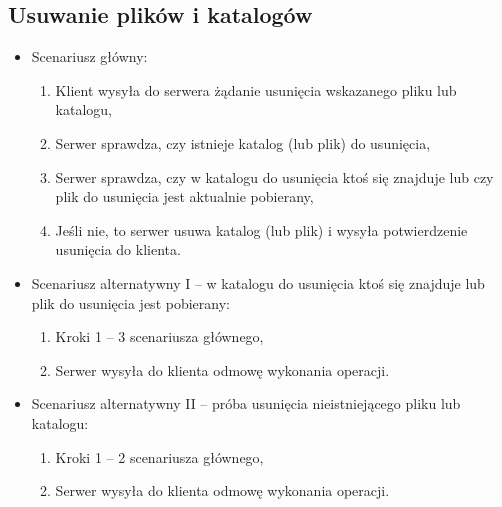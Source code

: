 \documentclass[10pt,a4paper]{article}
\begin{document}
\subsection{Usuwanie plików i katalogów}
\begin{itemize}
    \item Scenariusz główny:
    \begin{enumerate}
        \item Klient wysyła do serwera żądanie usunięcia wskazanego pliku lub katalogu,
        \item Serwer sprawdza, czy istnieje katalog (lub plik) do usunięcia,
        \item Serwer sprawdza, czy w katalogu do usunięcia ktoś się znajduje lub czy plik do usunięcia jest aktualnie pobierany,
        \item Jeśli nie, to serwer usuwa katalog (lub plik) i wysyła potwierdzenie usunięcia do klienta.
    \end{enumerate}

    \item Scenariusz alternatywny I -- w katalogu do usunięcia ktoś się znajduje lub plik do usunięcia jest pobierany:
    \begin{enumerate}
        \item Kroki 1 -- 3 scenariusza głównego,
        \item Serwer wysyła do klienta odmowę wykonania operacji.
    \end{enumerate}

    \item Scenariusz alternatywny II -- próba usunięcia nieistniejącego pliku lub katalogu:
    \begin{enumerate}
        \item Kroki 1 -- 2 scenariusza głównego,
        \item Serwer wysyła do klienta odmowę wykonania operacji.
    \end{enumerate}
\end{itemize}
\end{document}
